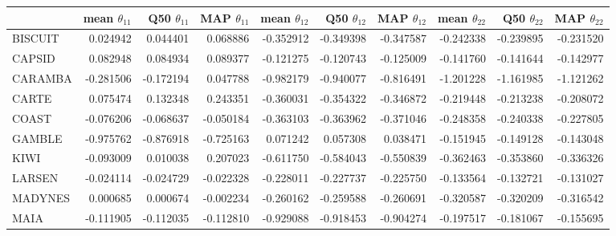 \begin{tabular}{lrrrrrrrrr}
\toprule
{} &  mean $\theta_{11}$ &  Q50 $\theta_{11}$ &  MAP $\theta_{11}$ &  mean $\theta_{12}$ &  Q50 $\theta_{12}$ &  MAP $\theta_{12}$ &  mean $\theta_{22}$ &  Q50 $\theta_{22}$ &  MAP $\theta_{22}$ \\
\midrule
BISCUIT     &            0.024942 &           0.044401 &           0.068886 &           -0.352912 &          -0.349398 &          -0.347587 &           -0.242338 &          -0.239895 &          -0.231520 \\
CAPSID      &            0.082948 &           0.084934 &           0.089377 &           -0.121275 &          -0.120743 &          -0.125009 &           -0.141760 &          -0.141644 &          -0.142977 \\
CARAMBA     &           -0.281506 &          -0.172194 &           0.047788 &           -0.982179 &          -0.940077 &          -0.816491 &           -1.201228 &          -1.161985 &          -1.121262 \\
CARTE       &            0.075474 &           0.132348 &           0.243351 &           -0.360031 &          -0.354322 &          -0.346872 &           -0.219448 &          -0.213238 &          -0.208072 \\
COAST       &           -0.076206 &          -0.068637 &          -0.050184 &           -0.363103 &          -0.363962 &          -0.371046 &           -0.248358 &          -0.240338 &          -0.227805 \\
GAMBLE      &           -0.975762 &          -0.876918 &          -0.725163 &            0.071242 &           0.057308 &           0.038471 &           -0.151945 &          -0.149128 &          -0.143048 \\
KIWI        &           -0.093009 &           0.010038 &           0.207023 &           -0.611750 &          -0.584043 &          -0.550839 &           -0.362463 &          -0.353860 &          -0.336326 \\
LARSEN      &           -0.024114 &          -0.024729 &          -0.022328 &           -0.228011 &          -0.227737 &          -0.225750 &           -0.133564 &          -0.132721 &          -0.131027 \\
MADYNES     &            0.000685 &           0.000674 &          -0.002234 &           -0.260162 &          -0.259588 &          -0.260691 &           -0.320587 &          -0.320209 &          -0.316542 \\
MAIA        &           -0.111905 &          -0.112035 &          -0.112810 &           -0.929088 &          -0.918453 &          -0.904274 &           -0.197517 &          -0.181067 &          -0.155695 \\

\end{tabular}
